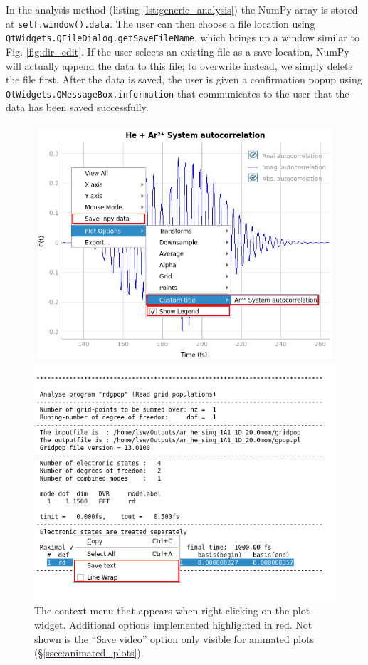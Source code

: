 \documentclass[12pt]{article}
\begin{document}
In the analysis method (listing \ref{lst:generic_analysis}) the NumPy array is stored at \texttt{self.window().data}. The user can then choose a file location using \texttt{QtWidgets.QFileDialog.getSaveFileName}, which brings up a window similar to Fig. \ref{fig:dir_edit}. If the user selects an existing file as a save location, NumPy will actually append the data to this file; to overwrite instead, we simply delete the file first. After the data is saved, the user is given a confirmation popup using \texttt{QtWidgets.QMessageBox.information} that communicates to the user that the data has been saved successfully.

\begin{figure}[h]
    \centering
    \begin{minipage}[t]{.47\textwidth}
        \centering
        \includegraphics[width=\textwidth]{img/plot_context_menu.png}
        \caption{The context menu that appears when right-clicking on the plot widget. Additional options implemented highlighted in red. Not shown is the ``Save video'' option only visible for animated plots (\S\ref{ssec:animated_plots}).}
        \label{fig:plot_context_menu}
    \end{minipage}\hfill\begin{minipage}[t]{.47\textwidth}
        \centering
        \includegraphics[width=\textwidth]{img/text_context_menu.png}

\end{minipage}
\end{figure}
\end{document}
